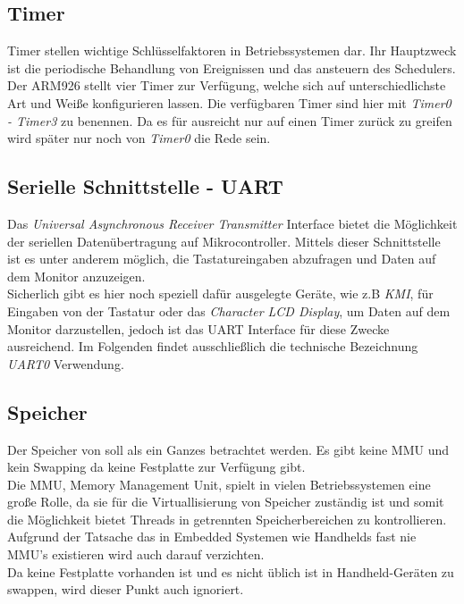 \subsection{Timer}
Timer stellen wichtige Schl\"usselfaktoren in Betriebssystemen dar. Ihr Hauptzweck ist die periodische Behandlung von Ereignissen und das ansteuern des Schedulers. \\
Der ARM926 stellt vier Timer zur Verf\"ugung, welche sich auf unterschiedlichste Art und Wei\ss e konfigurieren lassen. Die verf\"ugbaren Timer sind hier mit \textit{Timer0 - Timer3} zu benennen\parencite[vgl.][262]{archManI}. Da es f\"ur \mops ausreicht nur auf einen Timer zur\"uck zu greifen wird sp\"ater nur noch von \textit{Timer0} die Rede sein.
\subsection{Serielle Schnittstelle - UART}
Das \textit{Universal Asynchronous Receiver Transmitter} Interface bietet die M\"oglichkeit der seriellen Daten\"ubertragung auf Mikrocontroller. Mittels dieser Schnittstelle ist es unter anderem m\"oglich, die Tastatureingaben abzufragen und Daten auf dem Monitor anzuzeigen. \\
Sicherlich gibt es hier noch speziell daf\"ur ausgelegte Ger\"ate, wie z.B \textit{KMI}, f\"ur Eingaben von der Tastatur oder das \textit{Character LCD Display}, um Daten auf dem Monitor darzustellen,  jedoch ist das UART Interface f\"ur diese Zwecke ausreichend. Im Folgenden findet ausschlie\ss lich die technische Bezeichnung \textit{UART0} Verwendung.
\subsection{Speicher}
Der Speicher von \mops soll als ein Ganzes betrachtet werden. Es gibt keine MMU und kein Swapping da keine Festplatte zur Verf\"ugung gibt.\\
Die MMU, Memory Management Unit, spielt in vielen Betriebssystemen eine gro\ss e Rolle, da sie f\"ur die Virtuallisierung von Speicher zust\"andig ist und somit die M\"oglichkeit bietet Threads in getrennten Speicherbereichen zu kontrollieren. Aufgrund der Tatsache das in Embedded Systemen wie Handhelds fast nie MMU's existieren wird auch \mops darauf verzichten.\\
Da keine Festplatte vorhanden ist und es nicht \"ublich ist in Handheld-Ger\"aten zu swappen, wird dieser Punkt auch ignoriert.

